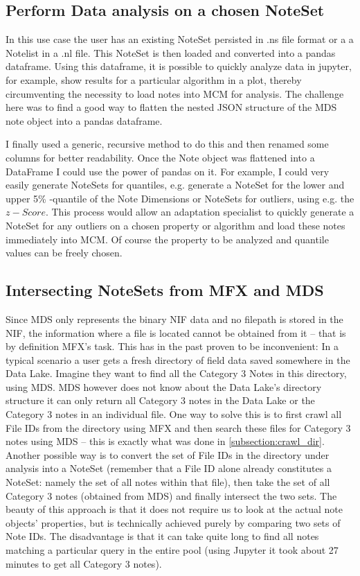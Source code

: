 \subsection{Perform Data analysis on a chosen NoteSet}
In this use case the user has an existing NoteSet persisted in .ns file format or a a Notelist in a .nl file. This NoteSet is then loaded and converted into a pandas dataframe. Using this dataframe, it is possible to quickly analyze data in jupyter, for example, show results for a particular algorithm in a plot, thereby circumventing the necessity to load notes into MCM for analysis. The challenge here was to find a good way to flatten the nested JSON structure of the MDS note object into a pandas dataframe. \par I finally used a generic, recursive method to do this and then renamed some columns for better readability. Once the Note object was flattened into a DataFrame I could use the power of pandas on it. For example, I could very easily generate NoteSets for quantiles, e.g. generate a NoteSet for the lower and upper 5\% -quantile of the Note Dimensions or NoteSets for outliers, using e.g. the $z-Score$. This process would allow an adaptation specialist to quickly generate a NoteSet for any outliers on a chosen property or algorithm and load these notes immediately into MCM. Of course the property to be analyzed and quantile values can be freely chosen.
\subsection{Intersecting NoteSets from MFX and MDS}
Since MDS only represents the binary NIF data and no filepath is stored in the NIF, the information where a file is located cannot be obtained from it -- that is by definition MFX's task. This has in the past proven to be inconvenient: In a typical scenario a user gets a fresh directory of field data saved somewhere in the Data Lake. Imagine they want to find all the Category 3 Notes in this directory, using MDS. MDS however does not know about the Data Lake's directory structure it can only return all Category 3 notes in the Data Lake
 or the Category 3 notes in an individual file. One way to solve this is to first crawl all File IDs from the directory using MFX and then search these files for Category 3 notes using MDS -- this is exactly what was done in \ref{subsection:crawl_dir}. Another possible way is to convert the set of File IDs in the directory under analysis into a NoteSet (remember that a File ID alone already constitutes a NoteSet: namely the set of all notes within that file), then take the set of all Category 3 notes (obtained from MDS) and finally intersect the two sets. The beauty of this approach is that it does not require us to look at the actual note objects' properties, but is technically achieved purely by comparing two sets of Note IDs. The disadvantage is that it can take quite long to find all notes matching a particular query in the entire pool (using Jupyter it took about 27 minutes to get all Category 3 notes).
